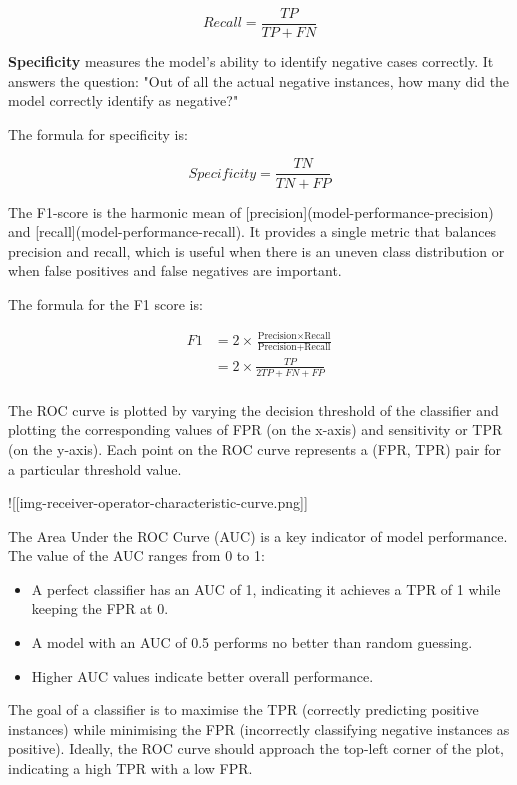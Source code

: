 \documentclass[conference]{IEEEtran}
\begin{document}
	
	$$Recall=\frac{TP}{TP + FN}$$
	
	\textbf{Specificity} measures the model's ability to identify negative cases correctly. It answers the question: "Out of all the actual negative instances, how many did the model correctly identify as negative?"
	
	The formula for specificity is:
	
	$$Specificity= \frac{TN}{TN + FP}$$
	
	The F1-score is the harmonic mean of [precision](model-performance-precision) and [recall](model-performance-recall). It provides a single metric that balances precision and recall, which is useful when there is an uneven class distribution or when false positives and false negatives are important.
	
	The formula for the F1 score is:
	
	\begin{align*}
			F1 
			&= 2 \times \frac{\text{Precision} \times \text{Recall}}{\text{Precision} + \text{Recall}}\\
			&= 2\times \frac{TP}{2TP+FN+FP}\\
	\end{align*}	
	
	\bigskip

	The ROC curve is plotted by varying the decision threshold of the classifier and plotting the corresponding values of FPR (on the x-axis) and sensitivity or TPR (on the y-axis). Each point on the ROC curve represents a (FPR, TPR) pair for a particular threshold value.
	
	![[img-receiver-operator-characteristic-curve.png]]

	The Area Under the ROC Curve (AUC) is a key indicator of model performance. The value of the AUC ranges from 0 to 1:
	
	
	\begin{itemize}
		\item A perfect classifier has an AUC of 1, indicating it achieves a TPR of 1 while keeping the FPR at 0.
		\item A model with an AUC of 0.5 performs no better than random guessing.
		\item Higher AUC values indicate better overall performance.
	\end{itemize}	

	The goal of a classifier is to maximise the TPR (correctly predicting positive instances) while minimising the FPR (incorrectly classifying negative instances as positive). Ideally, the ROC curve should approach the top-left corner of the plot, indicating a high TPR with a low FPR.
	
\end{document}
